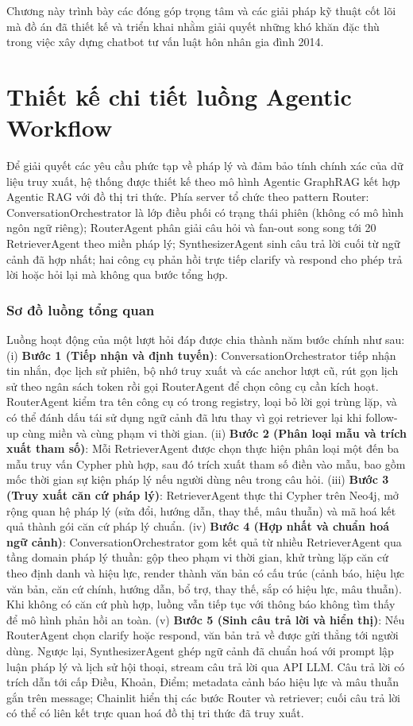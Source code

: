 \documentclass[../DoAn.tex]{subfiles}
\begin{document}
\label{chapter:5}
Chương này trình bày các đóng góp trọng tâm và các giải pháp kỹ thuật cốt lõi mà đồ án đã thiết kế và triển khai nhằm giải quyết những khó khăn đặc thù trong việc xây dựng chatbot tư vấn luật hôn nhân gia đình 2014.
\section{Thiết kế chi tiết luồng Agentic Workflow}
\label{section:agentic-workflow}

Để giải quyết các yêu cầu phức tạp về pháp lý và đảm bảo tính chính xác của dữ liệu truy xuất, hệ thống được thiết kế theo mô hình Agentic GraphRAG kết hợp Agentic RAG với đồ thị tri thức. Phía server tổ chức theo pattern Router: ConversationOrchestrator là lớp điều phối có trạng thái phiên (không có mô hình ngôn ngữ riêng); RouterAgent phân giải câu hỏi và fan-out song song tới 20 RetrieverAgent theo miền pháp lý; SynthesizerAgent sinh câu trả lời cuối từ ngữ cảnh đã hợp nhất; hai công cụ phản hồi trực tiếp clarify và respond cho phép trả lời hoặc hỏi lại mà không qua bước tổng hợp.

\subsubsection{Sơ đồ luồng tổng quan}

Luồng hoạt động của một lượt hỏi đáp được chia thành năm bước chính như sau:
(i) \textbf{Bước 1 (Tiếp nhận và định tuyến)}: ConversationOrchestrator tiếp nhận tin nhắn, đọc lịch sử phiên, bộ nhớ truy xuất và các anchor lượt cũ, rút gọn lịch sử theo ngân sách token rồi gọi RouterAgent để chọn công cụ cần kích hoạt. RouterAgent kiểm tra tên công cụ có trong registry, loại bỏ lời gọi trùng lặp, và có thể đánh dấu tái sử dụng ngữ cảnh đã lưu thay vì gọi retriever lại khi follow-up cùng miền và cùng phạm vi thời gian.
(ii) \textbf{Bước 2 (Phân loại mẫu và trích xuất tham số)}: Mỗi RetrieverAgent được chọn thực hiện phân loại một đến ba mẫu truy vấn Cypher phù hợp, sau đó trích xuất tham số điền vào mẫu, bao gồm mốc thời gian sự kiện pháp lý nếu người dùng nêu trong câu hỏi.
(iii) \textbf{Bước 3 (Truy xuất căn cứ pháp lý)}: RetrieverAgent thực thi Cypher trên Neo4j, mở rộng quan hệ pháp lý (sửa đổi, hướng dẫn, thay thế, mâu thuẫn) và mã hoá kết quả thành gói căn cứ pháp lý chuẩn.
(iv) \textbf{Bước 4 (Hợp nhất và chuẩn hoá ngữ cảnh)}: ConversationOrchestrator gom kết quả từ nhiều RetrieverAgent qua tầng domain pháp lý thuần: gộp theo phạm vi thời gian, khử trùng lặp căn cứ theo định danh và hiệu lực, render thành văn bản có cấu trúc (cảnh báo, hiệu lực văn bản, căn cứ chính, hướng dẫn, bổ trợ, thay thế, sắp có hiệu lực, mâu thuẫn). Khi không có căn cứ phù hợp, luồng vẫn tiếp tục với thông báo không tìm thấy để mô hình phản hồi an toàn.
(v) \textbf{Bước 5 (Sinh câu trả lời và hiển thị)}: Nếu RouterAgent chọn clarify hoặc respond, văn bản trả về được gửi thẳng tới người dùng. Ngược lại, SynthesizerAgent ghép ngữ cảnh đã chuẩn hoá với prompt lập luận pháp lý và lịch sử hội thoại, stream câu trả lời qua API LLM. Câu trả lời có trích dẫn tới cấp Điều, Khoản, Điểm; metadata cảnh báo hiệu lực và mâu thuẫn gắn trên message; Chainlit hiển thị các bước Router và retriever; cuối câu trả lời có thể có liên kết trực quan hoá đồ thị tri thức đã truy xuất.
\end{document}
